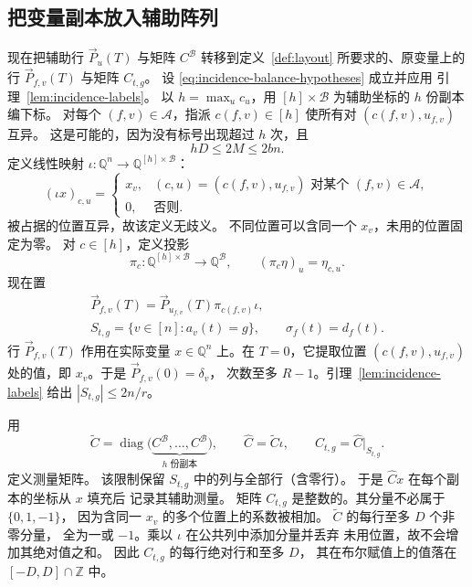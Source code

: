 \subsection{把变量副本放入辅助阵列}\label{subsec:embedding}
现在把辅助行 $\vec{P}_u(T)$ 与矩阵 $C^{\mathcal B}$
转移到定义~\ref{def:layout} 所要求的、原变量上的行
$\vec{P}_{f,v}(T)$ 与矩阵 $C_{t,g}$。
设 \eqref{eq:incidence-balance-hypotheses} 成立并应用
引理~\ref{lem:incidence-labels}。
以 $h=\max_u c_u$，用 $[h]\times\mathcal B$
为辅助坐标的 $h$ 份副本编下标。
对每个 $(f,v)\in\mathcal A$，指派 $c(f,v)\in[h]$
使所有对 $(c(f,v),u_{f,v})$ 互异。
这是可能的，因为没有标号出现超过 $h$ 次，且
\[
 hD\le2M\le2bn.
\]
定义线性映射
$\iota:\mathbb Q^n\longrightarrow\mathbb Q^{[h]\times\mathcal B}$：
\[
 (\iota x)_{c,u}=
 \begin{cases}
 x_v,&(c,u)=(c(f,v),u_{f,v})\text{ 对某个 }(f,v)\in\mathcal A,\\
 0,&\text{否则}.
 \end{cases}
\]
被占据的位置互异，故该定义无歧义。
不同位置可以含同一个 $x_v$，未用的位置固定为零。
对 $c\in[h]$，定义投影
\[
 \pi_c:\mathbb Q^{[h]\times\mathcal B}\longrightarrow\mathbb Q^{\mathcal B},
 \qquad (\pi_c\eta)_u=\eta_{c,u}.
\]
现在置
\begin{equation}\label{eq:actual-rows}
 \begin{gathered}
 \vec{P}_{f,v}(T)=\vec{P}_{u_{f,v}}(T)\pi_{c(f,v)}\iota,\\
 S_{t,g}=\{v\in[n]:a_v(t)=g\},\qquad \sigma_f(t)=d_f(t).
 \end{gathered}
\end{equation}
行 $\vec{P}_{f,v}(T)$ 作用在实际变量 $x\in\mathbb Q^n$
上。在 $T=0$，它提取位置 $(c(f,v),u_{f,v})$
处的值，即 $x_v$。于是 $\vec{P}_{f,v}(0)=\delta_v$，
次数至多 $R-1$。引理~\ref{lem:incidence-labels}
给出 $|S_{t,g}|\le2n/r$。

用
\begin{equation}\label{eq:actual-measurements}
 \widetilde C=\operatorname{diag}
   \bigl(\underbrace{C^{\mathcal B},\ldots,C^{\mathcal B}}_{h\text{ 份副本}}\bigr),
 \qquad \widehat C=\widetilde C\iota,
 \qquad C_{t,g}=\widehat C|_{S_{t,g}}.
\end{equation}
定义测量矩阵。
该限制保留 $S_{t,g}$ 中的列与全部行（含零行）。
于是 $\widehat Cx$ 在每个副本的坐标从 $x$ 填充后
记录其辅助测量。
矩阵 $C_{t,g}$ 是整数的。其分量不必属于 $\{0,1,-1\}$，
因为含同一 $x_v$ 的多个位置上的系数被相加。
$\widetilde C$ 的每行至多 $D$ 个非零分量，
全为一或 $-1$。乘以 $\iota$ 在公共列中添加分量并丢弃
未用位置，故不会增加其绝对值之和。
因此 $C_{t,g}$ 的每行绝对行和至多 $D$，
其在布尔赋值上的值落在 $[-D,D]\cap\mathbb Z$ 中。

